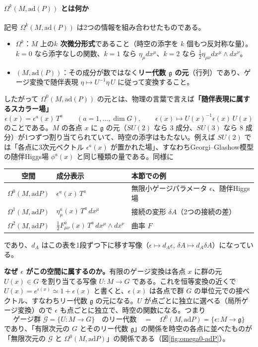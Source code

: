 \documentclass[uplatex, dvipdfmx, book]{jsbook}
\begin{document}
\paragraph{$\Omega^k(M, \mathrm{ad}(P))$ とは何か}
記号 $\Omega^k(M, \mathrm{ad}(P))$ は2つの情報を組み合わせたものである。
\begin{itemize}
    \item $\Omega^k$：$M$ 上の\textbf{$k$ 次微分形式}であること（時空の添字を $k$ 個もつ反対称な量）。$k=0$ なら添字なしの関数、$k=1$ なら $\eta_\mu dx^\mu$、$k=2$ なら $\frac12\eta_{\mu\nu}dx^\mu\wedge dx^\nu$。
    \item $(M, \mathrm{ad}(P))$：その成分が数ではなく\textbf{リー代数 $\mathfrak{g}$ の元}（行列）であり、ゲージ変換で随伴表現 $\eta \mapsto U^{-1}\eta\,U$ に従って変換すること。
\end{itemize}
したがって $\Omega^0(M,\mathrm{ad}(P))$ の元とは、物理の言葉で言えば\textbf{「随伴表現に属するスカラー場」}
\begin{equation*}
    \epsilon(x) = \epsilon^a(x)\, T^a \qquad (a = 1, \dots, \dim G), \qquad \epsilon(x) \mapsto U(x)^{-1}\epsilon(x)\,U(x)
\end{equation*}
のことである。$M$ の各点 $x$ に $\mathfrak{g}$ の元（$SU(2)$ なら $3$ 成分、$SU(3)$ なら $8$ 成分）が1つずつ割り当てられていて、時空の添字はもたない。例えば $SU(2)$ では「各点に3次元ベクトル $\epsilon^a(x)$ が置かれた場」、すなわちGeorgi--Glashow模型の随伴Higgs場 $\phi^a(x)$ と同じ種類の量である。同様に
\begin{center}
\begin{tabular}{c|l|l}
    空間 & 成分表示 & 本節での例 \\ \hline
    $\Omega^0(M,\mathrm{ad}P)$ & $\epsilon^a(x)\,T^a$ & 無限小ゲージパラメータ $\epsilon$、随伴Higgs場 \\
    $\Omega^1(M,\mathrm{ad}P)$ & $\eta^a_\mu(x)\,T^a\,dx^\mu$ & 接続の変形 $\delta A$（2つの接続の差） \\
    $\Omega^2(M,\mathrm{ad}P)$ & $\tfrac12 F^a_{\mu\nu}(x)\,T^a\,dx^\mu\wedge dx^\nu$ & 曲率 $F$
\end{tabular}
\end{center}
であり、$d_A$ はこの表を1段ずつ下に移す写像（$\epsilon \mapsto d_A\epsilon$, $\delta A \mapsto d_A\delta A$）になっている。

\textbf{なぜ $\epsilon$ がこの空間に属するのか。}有限のゲージ変換は各点 $x$ に群の元 $U(x) \in G$ を割り当てる写像 $U: M \to G$ である。これを恒等変換の近くで $U(x) = e^{\epsilon(x)} \simeq 1 + \epsilon(x)$ と書くと、$\epsilon(x)$ は各点で群 $G$ の単位元での接ベクトル、すなわちリー代数 $\mathfrak{g}$ の元になる。$U$ が点ごとに独立に選べる（局所ゲージ変換）ので $\epsilon$ も点ごとに独立で、時空の関数になる。つまり
\begin{equation*}
    \text{ゲージ群 } \mathcal{G} = \{U: M \to G\} \quad \text{のリー代数} \quad = \quad \Omega^0(M, \mathrm{ad}P) = \{\epsilon: M \to \mathfrak{g}\}
\end{equation*}
であり、「有限次元の $G$ とそのリー代数 $\mathfrak{g}$」の関係を時空の各点に並べたものが「無限次元の $\mathcal{G}$ と $\Omega^0(M,\mathrm{ad}P)$」の関係である（図\ref{fig:omega0-adP}）。
\end{document}
